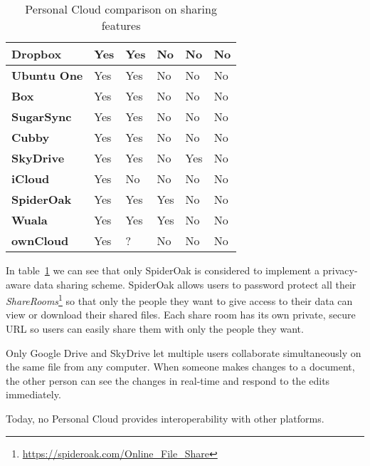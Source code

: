 {{\begin{table}
\begin{center}
\begin{tabular}{ | p{3.3cm} | p{1.5cm} | p{1.5cm} | p{1.5cm} | p{1.5cm} | p{1.5cm} | }
	\textbf{Dropbox} &
	Yes &
	Yes &
	No &
	No &
	No \\ \hline
	
	\textbf{Ubuntu One} &
	Yes &
	Yes &
	No &
	No &
	No \\ \hline
	
	\textbf{Box} &
	Yes &
	Yes &
	No &
	No &
	No \\ \hline
	
	\textbf{SugarSync} & 
	Yes &
	Yes &
	No &
	No &
	No \\ \hline
	
	\textbf{Cubby} &
	Yes &
	Yes &
	No &
	No &
	No \\ \hline
	
	\textbf{SkyDrive} & 
	Yes &
	Yes &
	No &
	Yes &
	No \\ \hline

	\textbf{iCloud} &
	Yes &
	No &
	No &
	No &
	No \\ \hline
	
	\textbf{SpiderOak} & 
	Yes &
	Yes &
	Yes &
	No &
	No \\ \hline

	\textbf{Wuala} &
	Yes &
	Yes &
	Yes &
	No &
	No \\ \hline
	
	\textbf{ownCloud} &
	Yes &
	? &
	No &
	No &
	No \\ \hline

    \end{tabular}
    \caption{Personal Cloud comparison on sharing features}
    \label{tab:pc_sharing}
\end{center}
\end{table}
}


In table~\ref{tab:pc_sharing} we can see that only SpiderOak is considered to implement a privacy-aware data sharing scheme. SpiderOak allows users to password protect all their \textit{ShareRooms}\footnote{\url{https://spideroak.com/Online_File_Share}} so that only the people they want to give access to their data can view or download their shared files. Each share room has its own private, secure URL so users can easily share them with only the people they want.


Only Google Drive and SkyDrive let multiple users collaborate simultaneously on the same file from any computer. When someone makes changes to a document, the other person can see the changes in real-time and respond to the edits immediately.

Today, no Personal Cloud provides interoperability with other platforms.


}
